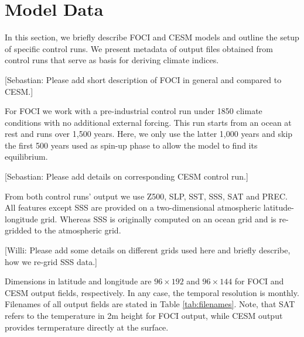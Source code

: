 \documentclass{CUP-JNL-DTM}%
\theoremstyle{definition}
\numberwithin{equation}{section}
\begin{document}
\section{Model Data \label{sec:Model_Data}}

In this section, we briefly describe FOCI and CESM models and outline the setup of specific control runs. We present metadata of output files obtained from control runs that serve as basis for deriving climate indices.

[Sebastian: Please add short description of FOCI in general and compared to CESM.]

For FOCI we work with a pre-industrial control run under 1850 climate conditions with no additional external forcing. This run starts from an ocean at rest and runs over 1,500 years. Here, we only use the latter 1,000 years and skip the first 500 years used as spin-up phase to allow the model to find its equilibrium.

[Sebastian: Please add details on corresponding CESM control run.]

From both control runs' output we use Z500, SLP, SST, SSS, SAT and PREC. All features except SSS are provided on a two-dimensional atmospheric latitude-longitude grid. Whereas SSS is originally computed on an ocean grid and is re-gridded to the atmospheric grid. 

[Willi: Please add some details on different grids used here and briefly describe, how we re-grid SSS data.]

Dimensions in latitude and longitude are $96 \times 192$ and $96 \times 144$ for FOCI and CESM output fields, respectively. In any case, the temporal resolution is monthly. Filenames of all output fields are stated in Table \ref{tab:filenames}. Note, that SAT refers to the temperature in 2m height for FOCI output, while CESM output provides termperature directly at the surface.
\end{document}
